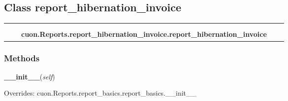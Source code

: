 \subsection{Class report\_hibernation\_invoice}

    \label{cuon:Reports:report_hibernation_invoice:report_hibernation_invoice}
\begin{tabular}{cccccc}
\multicolumn{2}{r}{\settowidth{\BCL}{cuon.Reports.report\_basics.report\_basics}\multirow{2}{\BCL}{cuon.Reports.report\_basics.report\_basics}}
&&
  \\\cline{3-3}
  &&\multicolumn{1}{c|}{}
&&
  \\
&&\multicolumn{2}{l}{\textbf{cuon.Reports.report\_hibernation\_invoice.report\_hibernation\_invoice}}
\end{tabular}



  \subsubsection{Methods}

    \vspace{0.5ex}

\hspace{.8\funcindent}\begin{boxedminipage}{\funcwidth}

    \raggedright \textbf{\_\_init\_\_}(\textit{self})

\setlength{\parskip}{2ex}
\setlength{\parskip}{1ex}
      Overrides: cuon.Reports.report\_basics.report\_basics.\_\_init\_\_

    \end{boxedminipage}

    \label{cuon:Reports:report_hibernation_invoice:report_hibernation_invoice:getReportData}

    \vspace{0.5ex}

